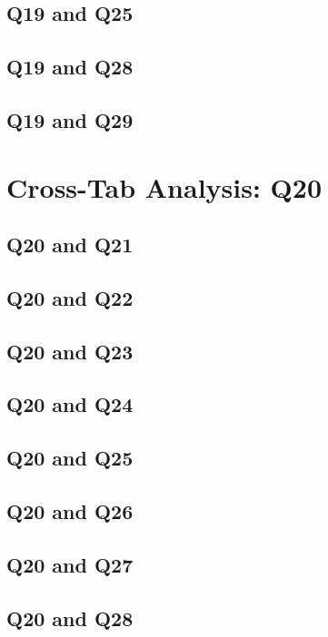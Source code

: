 \documentclass{report}
\begin{document}
\section{Q19 and Q25}\clearpage
\section{Q19 and Q28}\clearpage
\section{Q19 and Q29}\clearpage

\chapter{Cross-Tab Analysis: Q20}

\section{Q20 and Q21}\clearpage
\section{Q20 and Q22}\clearpage
\section{Q20 and Q23}\clearpage
\section{Q20 and Q24}\clearpage
\section{Q20 and Q25}\clearpage
\section{Q20 and Q26}\clearpage
\section{Q20 and Q27}\clearpage
\section{Q20 and Q28}\clearpage
\end{document}
